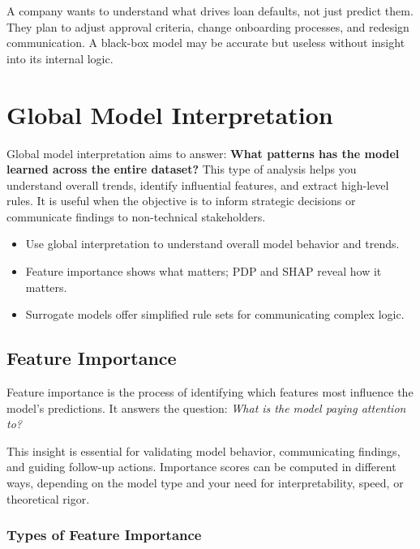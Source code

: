 \documentclass[12pt,openany]{book}
\begin{document}
\begin{examplebox}
A company wants to understand what drives loan defaults, not just predict them. They plan to adjust approval criteria, change onboarding processes, and redesign communication. A black-box model may be accurate but useless without insight into its internal logic.
\end{examplebox}



\chapter{Global Model Interpretation}

Global model interpretation aims to answer: \textbf{What patterns has the model learned across the entire dataset?} This type of analysis helps you understand overall trends, identify influential features, and extract high-level rules. It is useful when the objective is to inform strategic decisions or communicate findings to non-technical stakeholders.


\begin{summarybox}
\begin{itemize}
  \item Use global interpretation to understand overall model behavior and trends.
  \item Feature importance shows what matters; PDP and SHAP reveal how it matters.
  \item Surrogate models offer simplified rule sets for communicating complex logic.
\end{itemize}
\end{summarybox}

\section{Feature Importance}

Feature importance is the process of identifying which features most influence the model’s predictions. It answers the question: \textit{What is the model paying attention to?}

This insight is essential for validating model behavior, communicating findings, and guiding follow-up actions. Importance scores can be computed in different ways, depending on the model type and your need for interpretability, speed, or theoretical rigor.

\subsection{Types of Feature Importance}
\end{document}

